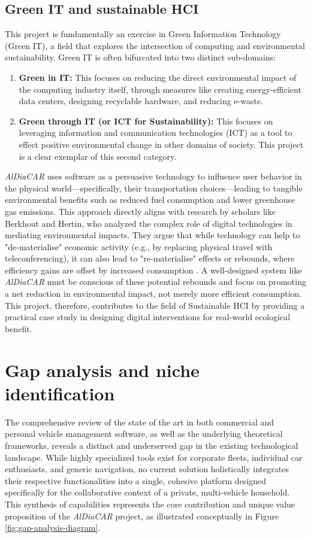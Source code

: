 \subsection{Green IT and sustainable HCI}
This project is fundamentally an exercise in Green Information Technology (Green IT), a field that explores the intersection of computing and environmental sustainability. Green IT is often bifurcated into two distinct sub-domains:
\begin{enumerate}
    \item \textbf{Green in IT:} This focuses on reducing the direct environmental impact of the computing industry itself, through measures like creating energy-efficient data centers, designing recyclable hardware, and reducing e-waste.
    \item \textbf{Green through IT (or ICT for Sustainability):} This focuses on leveraging information and communication technologies (ICT) as a tool to effect positive environmental change in other domains of society. This project is a clear exemplar of this second category.
\end{enumerate}

\textgap

\textit{AlDiaCAR} uses software as a persuasive technology to influence user behavior in the physical world—specifically, their transportation choices—leading to tangible environmental benefits such as reduced fuel consumption and lower greenhouse gas emissions. This approach directly aligns with research by scholars like Berkhout and Hertin, who analyzed the complex role of digital technologies in mediating environmental impacts. They argue that while technology can help to "de-materialise" economic activity (e.g., by replacing physical travel with teleconferencing), it can also lead to "re-materialise" effects or rebounds, where efficiency gains are offset by increased consumption \cite{berkhout2004de}. A well-designed system like \textit{AlDiaCAR} must be conscious of these potential rebounds and focus on promoting a net reduction in environmental impact, not merely more efficient consumption. This project, therefore, contributes to the field of Sustainable HCI by providing a practical case study in designing digital interventions for real-world ecological benefit.

\section{Gap analysis and niche identification}
The comprehensive review of the state of the art in both commercial and personal vehicle management software, as well as the underlying theoretical frameworks, reveals a distinct and underserved gap in the existing technological landscape. While highly specialized tools exist for corporate fleets, individual car enthusiasts, and generic navigation, no current solution holistically integrates their respective functionalities into a single, cohesive platform designed specifically for the collaborative context of a private, multi-vehicle household. This synthesis of capabilities represents the core contribution and unique value proposition of the \textit{AlDiaCAR} project, as illustrated conceptually in Figure \ref{fig:gap-analysis-diagram}.

